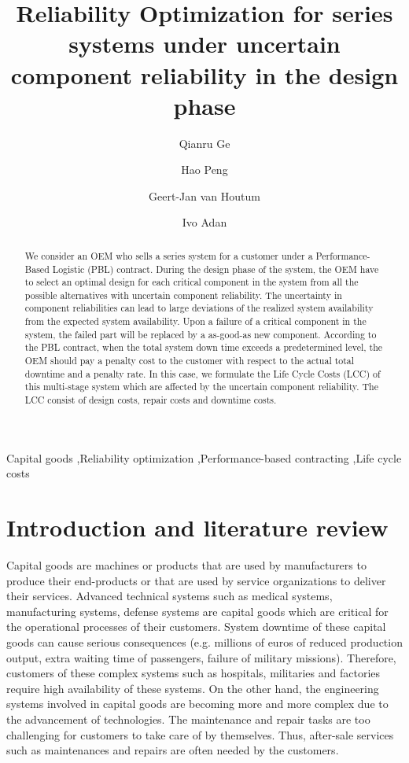 \documentclass[preprint,12pt]{elsarticle}
\begin{document}
\nocite{*}

\begin{frontmatter}
\title{Reliability Optimization for series systems under uncertain component reliability in the design phase}
\author[label1]{Qianru Ge}
\author[label1]{Hao Peng}
\author[label1]{Geert-Jan van Houtum}
\author[label1]{Ivo Adan}



\address[label1]{Department of Industrial Engineering and Innovation Sciences, Eindhoven University of Technology, Eindhoven, The Netherlands}

\begin{abstract}
We consider an OEM who sells a series system for a customer under a Performance-Based Logistic (PBL) contract. During the design phase of the system, the OEM have to select an optimal design for each critical component in the system from all the possible alternatives with uncertain component reliability. The uncertainty  in component reliabilities can lead to large deviations of the realized system availability from the expected system availability. Upon a failure of a critical component in the system, the failed part will be replaced by a as-good-as new component. According to the PBL contract, when the total system down time exceeds a predetermined level, the OEM should pay a penalty cost to the customer with respect to the actual total downtime and a penalty rate. In this case, we formulate the Life Cycle Costs (LCC) of this multi-stage system which are affected by the uncertain component reliability. The LCC consist of design costs, repair costs and downtime costs.
\end{abstract}

\begin{keyword}
Capital goods \sep Reliability optimization  \sep Performance-based contracting \sep Life cycle costs
\end{keyword}
\end{frontmatter}
\section{Introduction and literature review}
Capital goods are machines or products that are used by manufacturers to produce their end-products or that are used by service organizations to deliver their services. Advanced technical systems such as medical systems, manufacturing systems, defense systems are capital goods which are critical for the operational processes of their customers. System downtime of these capital goods can cause serious consequences (e.g. millions of euros of reduced production output, extra waiting time of passengers, failure of military missions). Therefore, customers of these complex systems such as hospitals, militaries and factories require high availability of these systems. On the other hand, the engineering systems involved in capital goods are becoming more and more complex due to the advancement of technologies. The maintenance and repair tasks are too challenging for customers to take care of by themselves. Thus, after-sale services such as maintenances and repairs are often needed by the customers.
\end{document}
